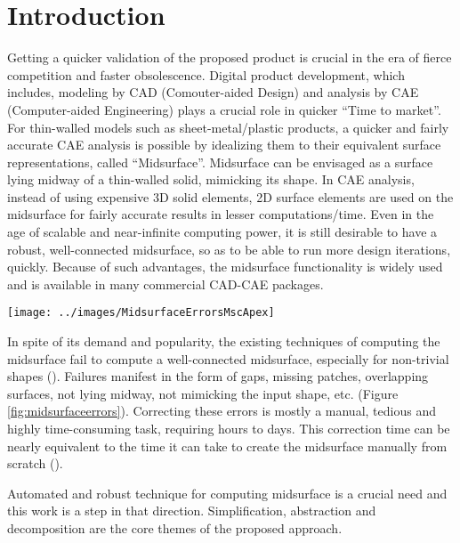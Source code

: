\section{Introduction}\label{sec:intro}

Getting a quicker validation of the proposed product is crucial in the era of fierce competition and faster obsolescence. Digital product development, which includes, modeling by CAD (Comouter-aided Design)  and analysis by CAE (Computer-aided Engineering) plays a crucial role in quicker ``Time to market''.  For thin-walled models such as sheet-metal/plastic products, a quicker and fairly accurate CAE analysis is possible by idealizing them to their equivalent surface representations, called ``Midsurface''. Midsurface can be envisaged as a surface lying midway of a thin-walled solid, mimicking its shape.   In CAE analysis, instead of using expensive 3D solid elements, 2D surface elements are used on the midsurface for fairly accurate results in lesser computations/time.  Even in the age of scalable and near-infinite computing power, it is still desirable to have  a robust, well-connected midsurface, so as to be able to run more design iterations, quickly.  Because of such advantages, the midsurface functionality is widely used and is available in many commercial CAD-CAE packages. 

\begin{minipage}[h]{\linewidth} 
\begin{minipage}[h]{0.5\linewidth} 
		\centering
		\texttt{[image: ../images/MidsurfaceErrorsMscApex]}
		\label{fig:midsurfaceerrors}
\end{minipage}
\hfill
\begin{minipage}[h]{0.5\linewidth} 
In spite of its demand and popularity, the existing techniques of computing the midsurface fail to compute a well-connected midsurface, especially for non-trivial shapes (\cite{Woo2013,Automex}). Failures manifest in the form of gaps, missing patches, overlapping surfaces, not lying midway, not mimicking the input shape, etc. (Figure \ref{fig:midsurfaceerrors}). Correcting these errors is mostly a manual, tedious and highly time-consuming task, requiring hours to days. This correction time can be nearly equivalent to the time it can take to create the midsurface manually from scratch (\cite{Stolt2006}). 
\end{minipage}
\end{minipage}



 Automated and  robust technique for computing midsurface  is a crucial need and this work is a step in that direction. Simplification, abstraction and decomposition are the core themes of the proposed approach.

